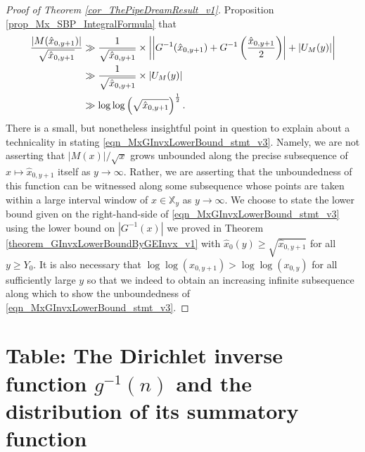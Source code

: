 \documentclass[11pt,reqno,a4letter]{article}
\numberwithin{figure}{section}
\numberwithin{table}{section}
\theoremstyle{plain}
\numberwithin{theorem}{section}
\theoremstyle{definition}
\begin{document}
\begin{proof}[Proof of Theorem \ref{cor_ThePipeDreamResult_v1}]
Proposition \ref{prop_Mx_SBP_IntegralFormula} that 
\begin{align} 
\notag 
\frac{|M(\hat{x}_{0,y+1})|}{\sqrt{\hat{x}_{0,y+1}}} & \gg \frac{1}{\sqrt{\hat{x}_{0,y+1}}} \times 
     \left\lvert \left\lvert 
     G^{-1}(\hat{x}_{0,y+1}) + G^{-1}\left(\frac{\hat{x}_{0,y+1}}{2}\right) \right\rvert + 
     \left\lvert U_M(y) \right\rvert \right\rvert \\ 
\notag 
     & \gg \frac{1}{\sqrt{\hat{x}_{0,y+1}}} \times \left\lvert U_M(y) \right\rvert \\ 
\label{eqn_MxGInvxLowerBound_stmt_v3} 
     & \gg \log\log\left(\sqrt{\hat{x}_{0,y+1}}\right)^{\frac{1}{2}}. 
\end{align} 
There is a small, but nonetheless insightful point in question 
to explain about a 
technicality in stating \eqref{eqn_MxGInvxLowerBound_stmt_v3}. 
Namely, we are not asserting that 
$|M(x)| / \sqrt{x}$ grows unbounded along the precise subsequence of 
$x \mapsto \hat{x}_{0,y+1}$ itself as $y \rightarrow \infty$. 
Rather, we are asserting that the unboundedness of this function 
can be witnessed along some subsequence whose points are taken within a 
large interval window of 
$x \in \mathbb{X}_y$ as 
$y \rightarrow \infty$. 
We choose to state the lower bound given on the right-hand-side of 
\eqref{eqn_MxGInvxLowerBound_stmt_v3} using the 
lower bound on $|G^{-1}(x)|$ we proved in 
Theorem \ref{theorem_GInvxLowerBoundByGEInvx_v1} 
with $\hat{x}_0(y) \geq \sqrt{\hat{x}_{0,y+1}}$ for all $y \geq Y_0$. 
It is also necessary that $\log\log(x_{0,y+1}) > \log\log(x_{0,y})$ 
for all sufficiently large $y$ so that we indeed to obtain an increasing infinite 
subsequence along which to show the unboundedness of 
\eqref{eqn_MxGInvxLowerBound_stmt_v3}. 
\end{proof} 

\newpage 
\renewcommand{\refname}{References} 
{}


\newpage
\setcounter{section}{0} 
\renewcommand{\thesection}{T.\arabic{section}} 

\section{Table: The Dirichlet inverse function $g^{-1}(n)$ and the 
         distribution of its summatory function} 
\label{table_conjecture_Mertens_ginvSeq_approx_values}
\end{document}
